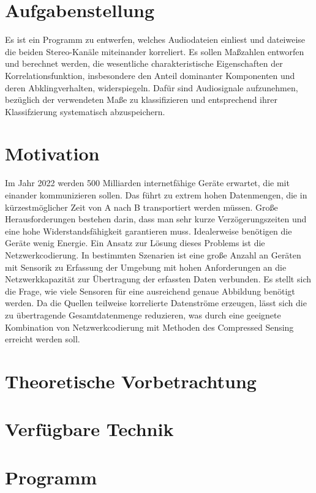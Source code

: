 \section{Aufgabenstellung}
Es ist ein Programm zu entwerfen, welches Audiodateien einliest und dateiweise die beiden Stereo-Kanäle miteinander korreliert. Es sollen Maßzahlen entworfen und berechnet werden, die wesentliche charakteristische Eigenschaften der Korrelationsfunktion, insbesondere den Anteil dominanter Komponenten und deren Abklingverhalten, widerspiegeln. Dafür sind Audiosignale aufzunehmen, bezüglich der verwendeten Maße zu klassifizieren und entsprechend ihrer Klassifzierung systematisch abzuspeichern.
\section{Motivation}
Im Jahr 2022 werden 500 Milliarden internetfähige Geräte erwartet, die mit einander kommunizieren sollen. Das führt zu extrem hohen Datenmengen, die in kürzestmöglicher Zeit von A nach B transportiert werden müssen. Große Herausforderungen bestehen darin, dass man sehr kurze Verzögerungszeiten und eine hohe Widerstandsfähigkeit garantieren muss. Idealerweise benötigen die Geräte wenig Energie. Ein Ansatz zur Lösung dieses Problems ist die Netzwerkcodierung.\newline
In bestimmten Szenarien ist eine große Anzahl an Geräten mit Sensorik zu Erfassung der Umgebung mit hohen Anforderungen an die Netzwerkkapazität zur Übertragung der erfassten Daten verbunden. Es stellt sich die Frage, wie viele Sensoren für eine ausreichend genaue Abbildung benötigt werden. Da die Quellen teilweise korrelierte Datenströme erzeugen, lässt sich die zu übertragende Gesamtdatenmenge reduzieren, was durch eine geeignete Kombination von Netzwerkcodierung mit Methoden des Compressed Sensing erreicht werden soll.
\newpage
\section{Theoretische Vorbetrachtung}


\newpage
\section{Verfügbare Technik}

\newpage
\section{Programm}

\newpage
